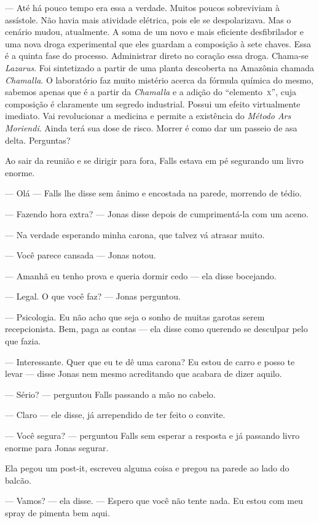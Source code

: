 --- Até há pouco tempo era essa a verdade. Muitos poucos sobreviviam à assístole. Não havia mais atividade elétrica, pois ele se despolarizava. Mas o cenário mudou, atualmente. A soma de um novo e mais eficiente desfibrilador e uma nova droga experimental\mudanca{,} que eles guardam a composição à sete chaves. Essa é a quinta fase do processo. Administrar direto no coração essa droga. Chama-se \emph{Lazarus}. Foi sintetizado a partir de uma planta descoberta na Amazônia chamada \emph{Chamalla}. O laboratório faz muito mistério acerca da fórmula química do mesmo, sabemos apenas que é a partir da \emph{Chamalla} e a adição do ``elemento~\textsc{x}'', cuja composição é claramente um segredo industrial. Possui um efeito virtualmente imediato. Vai revolucionar a medicina e permite a existência do \emph{Método Ars Moriendi}. Ainda terá sua dose de risco. Morrer é como dar um passeio de asa delta. Perguntas?

Ao sair da reunião e se dirigir para fora, Falls estava em pé segurando um livro enorme.

--- Olá --- Falls lhe disse sem ânimo e encostada na parede, morrendo de tédio.

--- Fazendo hora extra? --- Jonas disse\mudanca{,} depois de cumprimentá-la com um aceno.

--- Na verdade esperando minha carona, que talvez vá atrasar muito.

--- Você parece cansada --- Jonas notou.

--- Amanhã eu tenho prova e queria dormir cedo --- ela disse bocejando.

--- Legal. O que você faz? --- Jonas perguntou.

--- Psicologia. Eu não acho que seja o sonho de muitas garotas serem recepcionista. Bem, paga as contas --- ela disse como querendo se desculpar pelo que fazia.

--- Interessante. Quer que eu te dê uma carona? Eu estou de carro e posso te levar --- disse Jonas nem mesmo acreditando que acabara de dizer aquilo.

--- Sério? --- perguntou Falls passando a mão no cabelo.

--- Claro --- ele disse, já arrependido de ter feito o convite.

--- Você segura? --- perguntou Falls sem esperar a resposta e já passando livro enorme para Jonas segurar.

Ela pegou um post-it, escreveu alguma coisa e pregou na parede ao lado do balcão.

--- Vamos? --- ela disse. --- Espero que você não tente nada. Eu estou com meu spray de pimenta bem aqui.

